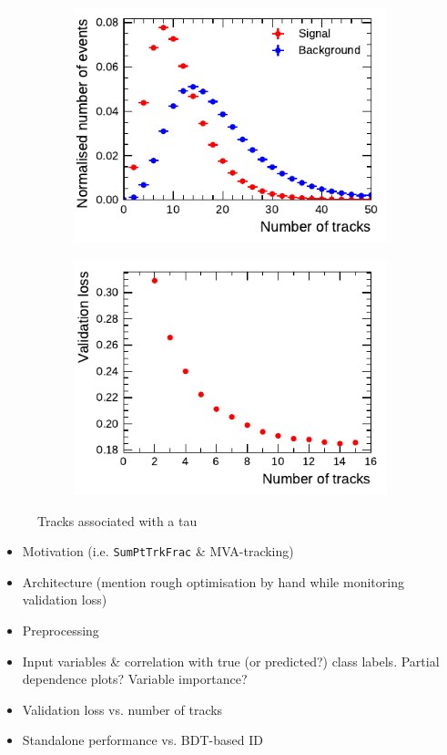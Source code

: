 \begin{figure}[ht]
  \begin{subfigure}[t]{0.48\textwidth}
    \centering
    \includegraphics{./figures/rnn/ntrk_1p.pdf}
  \end{subfigure}\hfill
  \begin{subfigure}[t]{0.48\textwidth}
    \centering
    \includegraphics{./figures/rnn/nscan/track_1p.pdf}
  \end{subfigure}
  \caption{Tracks associated with a tau}
  \label{fig:rnn_ntracks}
\end{figure}

\begin{itemize}
\item Motivation (i.e. \texttt{SumPtTrkFrac} \& MVA-tracking)
\item Architecture (mention rough optimisation by hand while monitoring
  validation loss)
\item Preprocessing
\item Input variables \& correlation with true (or predicted?) class labels.
  Partial dependence plots? Variable importance?
\item Validation loss vs. number of tracks
\item Standalone performance vs. BDT-based ID
\end{itemize}

